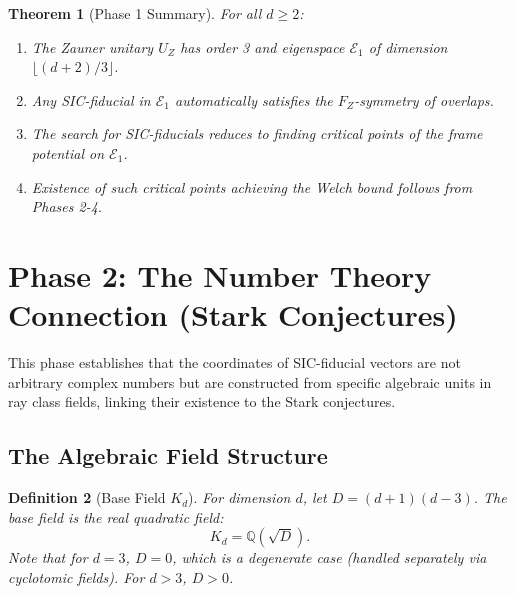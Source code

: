 \documentclass[a4paper,11pt]{article}
\newtheorem{theorem}{Theorem}[section]
\newtheorem{definition}[theorem]{Definition}
\newcommand{\Q}{\mathbb{Q}}
\begin{document}
\begin{theorem}[Phase 1 Summary]\label{thm:phase1-summary}
For all $d \geq 2$:
\begin{enumerate}[label=(\roman*)]
    \item The Zauner unitary $U_Z$ has order 3 and eigenspace $\mathcal{E}_1$ of dimension $\lfloor (d+2)/3 \rfloor$.
    \item Any SIC-fiducial in $\mathcal{E}_1$ automatically satisfies the $F_Z$-symmetry of overlaps.
    \item The search for SIC-fiducials reduces to finding critical points of the frame potential on $\mathcal{E}_1$.
    \item Existence of such critical points achieving the Welch bound follows from Phases 2-4.
\end{enumerate}
\end{theorem}
\section{Phase 2: The Number Theory Connection (Stark Conjectures)}

This phase establishes that the coordinates of SIC-fiducial vectors are not arbitrary complex numbers but are constructed from specific algebraic units in ray class fields, linking their existence to the Stark conjectures.

\subsection{The Algebraic Field Structure}

\begin{definition}[Base Field $K_d$]
For dimension $d$, let $D = (d+1)(d-3)$. The base field is the real quadratic field:
\begin{equation}
K_d = \Q(\sqrt{D}).
\end{equation}
Note that for $d=3$, $D=0$, which is a degenerate case (handled separately via cyclotomic fields). For $d > 3$, $D > 0$.
\end{definition}
\end{document}

